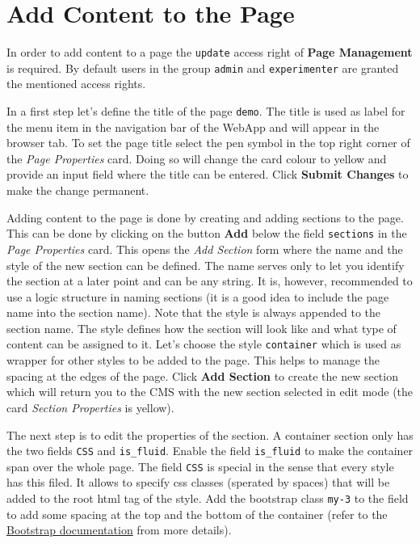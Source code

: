 \documentclass[a4paper,oneside]{book}
\begin{document}
\section{Add Content to the Page}
In order to add content to a page the \texttt{update} access right of \textbf{Page Management} is required.
By default users in the group \texttt{admin} and \texttt{experimenter} are granted the mentioned access rights.

In a first step let's define the title of the page \texttt{demo}.
The title is used as label for the menu item in the navigation bar of the WebApp and will appear in the browser tab.
To set the page title select the pen symbol in the top right corner of the \emph{Page Properties} card.
Doing so will change the card colour to yellow and provide an input field where the title can be entered.
Click \textbf{Submit Changes} to make the change permanent.

Adding content to the page is done by creating and adding sections to the page.
This can be done by clicking on the button \textbf{Add} below the field \texttt{sections} in the \emph{Page Properties} card.
This opens the \emph{Add Section} form where the name and the style of the new section can be defined.
The name serves only to let you identify the section at a later point and can be any string.
It is, however, recommended to use a logic structure in naming sections (it is a good idea to include the page name into the section name).
Note that the style is always appended to the section name.
The style defines how the section will look like and what type of content can be assigned to it.
Let's choose the style \texttt{container} which is used as wrapper for other styles to be added to the page.
This helps to manage the spacing at the edges of the page.
Click \textbf{Add Section} to create the new section which will return you to the CMS with the new section selected in edit mode (the card \emph{Section Properties} is yellow).

The next step is to edit the properties of the section.
A container section only has the two fields \texttt{CSS} and \texttt{is\_fluid}.
Enable the field \texttt{is\_fluid} to make the container span over the whole page.
The field \texttt{CSS} is special in the sense that every style has this filed.
It allows to specify css classes (sperated by spaces) that will be added to the root html tag of the style.
Add the bootstrap class \texttt{my-3} to the field to add some spacing at the top and the bottom of the container (refer to the \href{https://getbootstrap.com/docs/4.1/utilities/spacing/}{Bootstrap documentation} from more details).
\end{document}
